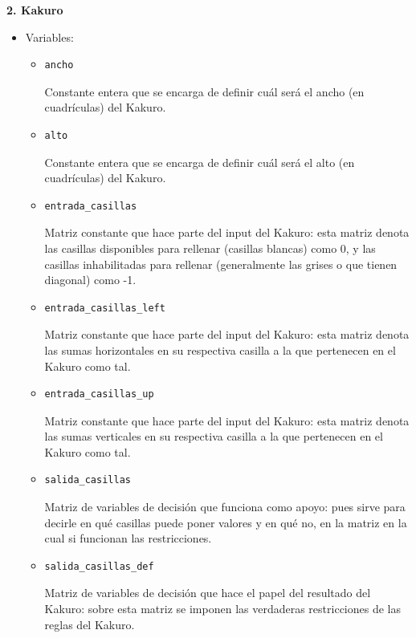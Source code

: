 \documentclass[12pt]{article}
\begin{document}
\newpage

\begin{flushleft}
\textbf{2. Kakuro}
\end{flushleft}

\begin{itemize}
\item Variables:
\begin{itemize}
\item \begin{verbatim}
ancho
\end{verbatim}
Constante entera que se encarga de definir cuál será el ancho (en cuadrículas) del Kakuro.
\item \begin{verbatim}
alto
\end{verbatim}
Constante entera que se encarga de definir cuál será el alto (en cuadrículas) del Kakuro.
\item \begin{verbatim}
entrada_casillas
\end{verbatim}
Matriz constante que hace parte del input del Kakuro: esta matriz denota las casillas disponibles para rellenar (casillas blancas) como 0, y las casillas inhabilitadas para rellenar (generalmente las grises o que tienen diagonal) como -1.
\item \begin{verbatim}
entrada_casillas_left
\end{verbatim}
Matriz constante que hace parte del input del Kakuro: esta matriz denota las sumas horizontales en su respectiva casilla a la que pertenecen en el Kakuro como tal.
\item \begin{verbatim}
entrada_casillas_up
\end{verbatim}
Matriz constante que hace parte del input del Kakuro: esta matriz denota las sumas verticales en su respectiva casilla a la que pertenecen en el Kakuro como tal.
\item \begin{verbatim}
salida_casillas
\end{verbatim}
Matriz de variables de decisión que funciona como apoyo: pues sirve para decirle en qué casillas puede poner valores y en qué no, en la matriz en la cual si funcionan las restricciones.
\item \begin{verbatim}
salida_casillas_def
\end{verbatim}
Matriz de variables de decisión que hace el papel del resultado del Kakuro: sobre esta matriz se imponen las verdaderas restricciones de las reglas del Kakuro.

\end{itemize}
\end{itemize}
\end{document}
